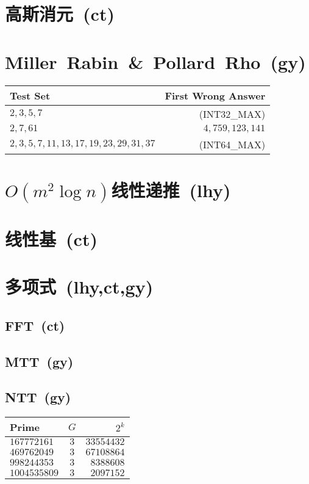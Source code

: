 \section{高斯消元\ \small(ct)}
\section{Miller\ Rabin\ \&\ Pollard\ Rho\ \small(gy)}
    \begin{tabular}{l r}
        \hline
        Test Set & First Wrong Answer\\\hline
        $ 2, 3, 5, 7 $ & (INT32\_MAX)\\\hline
        $ 2, 7, 61 $ & $ 4,759,123,141 $\\\hline
        $ 2, 3, 5, 7, 11, 13, 17, 19, 23, 29, 31, 37 $ & (INT64\_MAX)\\\hline
    \end{tabular}
\section{$ O(m ^ 2 \log n) $线性递推\ \small(lhy)}
\section{线性基\ \small(ct)}
\section{多项式\ \small(lhy,ct,gy)}
    \subsection*{FFT\ \small(ct)}
    \subsection*{MTT\ \small(gy)}
    \subsection*{NTT\ \small(gy)}
        \begin{tabular}{l c r}
            \hline
            Prime & $ G $ & $ 2^k $\\\hline
            $ 167772161 $ & $ 3 $ & $ 33554432 $\\\hline
            $ 469762049 $ & $ 3 $ & $ 67108864 $\\\hline
            $ 998244353 $ & $ 3 $ & $ 8388608 $\\\hline
            $ 1004535809 $ & $ 3 $ & $ 2097152 $\\\hline
        \end{tabular}

